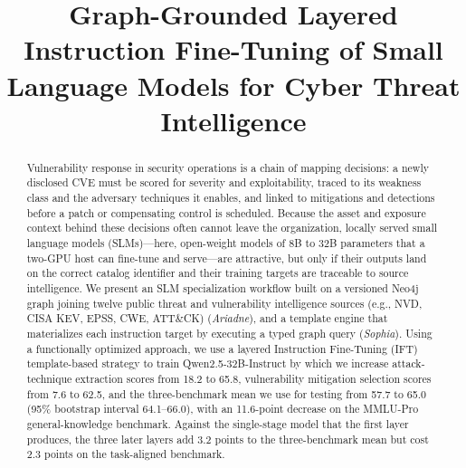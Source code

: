 \documentclass[conference]{IEEEtran}
\begin{document}

\title{Graph-Grounded Layered Instruction Fine-Tuning of Small Language Models for Cyber Threat Intelligence}

\author{
\and
{}
}

\maketitle

\begin{abstract}
Vulnerability response in security operations is a chain of mapping decisions: a newly disclosed CVE must be scored for severity and exploitability, traced to its weakness class and the adversary techniques it enables, and linked to mitigations and detections before a patch or compensating control is scheduled. Because the asset and exposure context behind these decisions often cannot leave the organization, locally served small language models (SLMs)---here, open-weight models of 8B to 32B parameters that a two-GPU host can fine-tune and serve---are attractive, but only if their outputs land on the correct catalog identifier and their training targets are traceable to source intelligence. We present an SLM specialization workflow built on a versioned Neo4j graph joining twelve public threat and vulnerability intelligence sources (e.g., NVD, CISA KEV, EPSS, CWE, ATT\&CK) (\emph{Ariadne}), and a template engine that materializes each instruction target by executing a typed graph query (\emph{Sophia}). Using a functionally optimized approach, we use a layered Instruction Fine-Tuning (IFT) template-based strategy to train Qwen2.5-32B-Instruct by which we increase attack-technique extraction scores from 18.2 to 65.8, vulnerability mitigation selection scores from 7.6 to 62.5, and the three-benchmark mean we use for testing from 57.7 to 65.0 (95\% bootstrap interval 64.1--66.0), with an 11.6-point decrease on the MMLU-Pro general-knowledge benchmark. Against the single-stage model that the first layer produces, the three later layers add 3.2 points to the three-benchmark mean but cost 2.3 points on the task-aligned benchmark.
\end{abstract}
\end{document}
